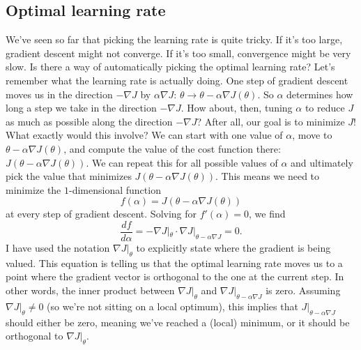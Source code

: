 \documentclass{article}
\theoremstyle{definition}
\begin{document}
\subsection{Optimal learning rate}
We've seen so far that picking the learning rate is quite tricky. If it's too large, gradient descent might not converge. If it's too small, convergence might be very slow. Is there a way of automatically picking the optimal learning rate? Let's remember what the learning rate is actually doing. One step of gradient descent moves us in the direction $-\nabla J$ by $\alpha\nabla J$: $\theta \to \theta - \alpha \nabla J(\theta)$. So $\alpha$ determines how long a step we take in the direction $-\nabla J$. How about, then, tuning $\alpha$ to reduce $J$ as much as possible along the direction $-\nabla J$? After all, our goal is to minimize $J$! What exactly would this involve? We can start with one value of $\alpha$, move to $\theta - \alpha \nabla J(\theta)$, and compute the value of the cost function there: $J(\theta - \alpha \nabla J(\theta))$. We can repeat this for all possible values of $\alpha$ and ultimately pick the value that minimizes $J(\theta - \alpha \nabla J(\theta))$. This means we need to minimize the $1$-dimensional function
\begin{equation}
    f(\alpha) = J(\theta - \alpha \nabla J(\theta))
\end{equation}
at every step of gradient descent. Solving for $f'(\alpha)=0$, we find
\begin{equation}
    \frac{df}{d\alpha} =-\nabla J|_{\theta}\cdot \nabla J|_{\theta - \alpha \nabla J} = 0.
    \label{graddes-eq:opt1}
\end{equation}
I have used the notation $\nabla J|_{\theta}$ to explicitly state where the gradient is being valued. This equation is telling us that the optimal learning rate moves us to a point where the gradient vector is  orthogonal to the one at the current step. In other words, the inner product between $\nabla J|_{\theta}$ and $\nabla J|_{\theta - \alpha \nabla J}$ is zero. Assuming $\nabla J|_{\theta}\neq 0$ (so we're not sitting on a local optimum), this implies that $J|_{\theta - \alpha \nabla J}$ should either be zero, meaning we've reached a (local) minimum, or it should be orthogonal to $\nabla J|_{\theta}$.
\end{document}
